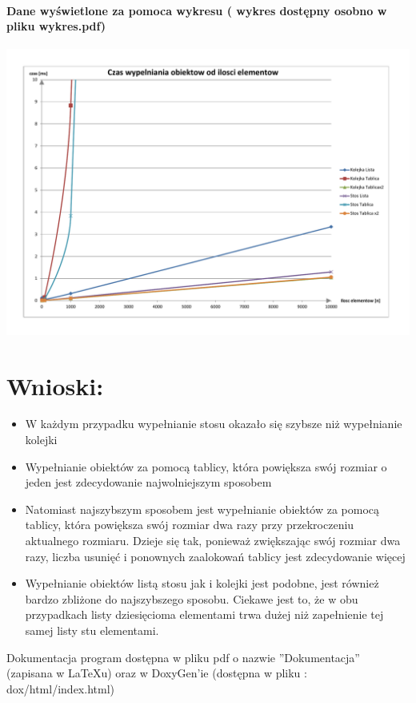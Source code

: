 \documentclass[10 pt]{article}
\begin{document}
\paragraph{Dane wyświetlone za pomoca wykresu ( wykres dostępny osobno w pliku wykres.pdf) }
\begin{center}
\includegraphics[scale=0.4]{wykres.pdf}
\end{center}

\section{Wnioski:}
\begin{itemize}
\item W każdym przypadku wypełnianie stosu okazało się szybsze niż wypełnianie kolejki
\item Wypełnianie obiektów za pomocą tablicy, która powiększa swój rozmiar o jeden jest zdecydowanie
najwolniejszym sposobem
\item Natomiast najszybszym sposobem jest wypełnianie obiektów za pomocą tablicy, która powiększa
swój rozmiar dwa razy przy przekroczeniu aktualnego rozmiaru. Dzieje się tak, ponieważ
zwiększając swój rozmiar dwa razy, liczba usunięć i ponownych zaalokowań tablicy jest
zdecydowanie więcej
\item Wypełnianie obiektów listą stosu jak i kolejki jest podobne, jest również bardzo zbliżone do
najszybszego sposobu. Ciekawe jest to, że w obu przypadkach listy dziesięcioma elementami trwa
dużej niż zapełnienie tej samej listy stu elementami.
\end{itemize}
Dokumentacja program dostępna w pliku pdf o nazwie ''Dokumentacja'' (zapisana w \LaTeX u) oraz w DoxyGen'ie (dostępna w pliku : dox/html/index.html)
\end{document}
